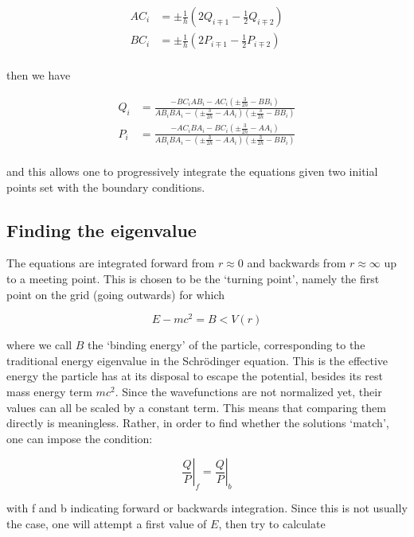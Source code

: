 \documentclass[]{report}
\begin{document}
\begin{align}
AC_i &= \pm\frac{1}{h}\left(2Q_{i\mp1}-\frac{1}{2}Q_{i\mp2}\right) \\
BC_i &= \pm\frac{1}{h}\left(2P_{i\mp1}-\frac{1}{2}P_{i\mp2}\right) \\
\end{align}

then we have

\begin{align}
Q_i &= \frac{-BC_iAB_i-AC_i(\pm\frac{3}{2h}-BB_i)}{AB_iBA_i-(\pm\frac{3}{2h}-AA_i)(\pm\frac{3}{2h}-BB_i)} \\
P_i &= \frac{-AC_iBA_i-BC_i(\pm\frac{3}{2h}-AA_i)}{AB_iBA_i-(\pm\frac{3}{2h}-AA_i)(\pm\frac{3}{2h}-BB_i)} \\
\end{align}

and this allows one to progressively integrate the equations given two initial points set with the boundary conditions.

\subsection{Finding the eigenvalue}

The equations are integrated forward from $r\approx0$ and backwards from $r\approx\infty$ up to a meeting point. This is chosen to be the `turning point', namely the first point on the grid (going outwards) for which

\begin{equation}
E-mc^2 = B < V(r)
\end{equation}

where we call $B$ the `binding energy' of the particle, corresponding to the traditional energy eigenvalue in the Schr\"{o}dinger equation. This is the effective energy the particle has at its disposal to escape the potential, besides its rest mass energy term $mc^2$.\newline
Since the wavefunctions are not normalized yet, their values can all be scaled by a constant term. This means that comparing them directly is meaningless. Rather, in order to find whether the solutions `match', one can impose the condition:

\begin{equation}
\left. \frac{Q}{P}\right|_f = \left. \frac{Q}{P}\right|_b
\end{equation}

with f and b indicating forward or backwards integration. Since this is not usually the case, one will attempt a first value of $E$, then try to calculate 
\end{document}
